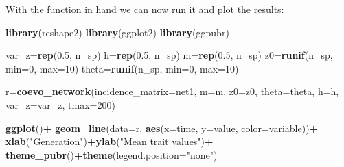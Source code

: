 \documentclass[
]{book}
\newenvironment{Shaded}{\begin{snugshade}}{\end{snugshade}}
\newcommand{\AttributeTok}[1]{\textcolor[rgb]{0.13,0.29,0.53}{#1}}
\newcommand{\CommentTok}[1]{\textcolor[rgb]{0.56,0.35,0.01}{\textit{#1}}}
\newcommand{\DecValTok}[1]{\textcolor[rgb]{0.00,0.00,0.81}{#1}}
\newcommand{\FloatTok}[1]{\textcolor[rgb]{0.00,0.00,0.81}{#1}}
\newcommand{\FunctionTok}[1]{\textcolor[rgb]{0.13,0.29,0.53}{\textbf{#1}}}
\newcommand{\NormalTok}[1]{#1}
\newcommand{\OtherTok}[1]{\textcolor[rgb]{0.56,0.35,0.01}{#1}}
\newcommand{\SpecialCharTok}[1]{\textcolor[rgb]{0.81,0.36,0.00}{\textbf{#1}}}
\newcommand{\StringTok}[1]{\textcolor[rgb]{0.31,0.60,0.02}{#1}}
\begin{document}
\begin{Shaded}
\end{Shaded}

With the function in hand we can now run it and plot the results:

\begin{Shaded}
\begin{Highlighting}[]
\FunctionTok{library}\NormalTok{(reshape2)}
\FunctionTok{library}\NormalTok{(ggplot2)}
\FunctionTok{library}\NormalTok{(ggpubr)}

\NormalTok{var\_z}\OtherTok{=}\FunctionTok{rep}\NormalTok{(}\FloatTok{0.5}\NormalTok{, n\_sp) }
\NormalTok{h}\OtherTok{=}\FunctionTok{rep}\NormalTok{(}\FloatTok{0.5}\NormalTok{, n\_sp) }
\NormalTok{m}\OtherTok{=}\FunctionTok{rep}\NormalTok{(}\FloatTok{0.5}\NormalTok{, n\_sp) }
\NormalTok{z0}\OtherTok{=}\FunctionTok{runif}\NormalTok{(n\_sp, }\AttributeTok{min=}\DecValTok{0}\NormalTok{, }\AttributeTok{max=}\DecValTok{10}\NormalTok{)}
\NormalTok{theta}\OtherTok{=}\FunctionTok{runif}\NormalTok{(n\_sp, }\AttributeTok{min=}\DecValTok{0}\NormalTok{, }\AttributeTok{max=}\DecValTok{10}\NormalTok{) }

\NormalTok{r}\OtherTok{=}\FunctionTok{coevo\_network}\NormalTok{(}\AttributeTok{incidence\_matrix=}\NormalTok{net1, }\AttributeTok{m=}\NormalTok{m, }\AttributeTok{z0=}\NormalTok{z0, }\AttributeTok{theta=}\NormalTok{theta, }\AttributeTok{h=}\NormalTok{h, }\AttributeTok{var\_z=}\NormalTok{var\_z, }\AttributeTok{tmax=}\DecValTok{200}\NormalTok{)}

\FunctionTok{ggplot}\NormalTok{()}\SpecialCharTok{+}
  \FunctionTok{geom\_line}\NormalTok{(}\AttributeTok{data=}\NormalTok{r, }\FunctionTok{aes}\NormalTok{(}\AttributeTok{x=}\NormalTok{time, }\AttributeTok{y=}\NormalTok{value, }\AttributeTok{color=}\NormalTok{variable))}\SpecialCharTok{+}
  \FunctionTok{xlab}\NormalTok{(}\StringTok{"Generation"}\NormalTok{)}\SpecialCharTok{+}\FunctionTok{ylab}\NormalTok{(}\StringTok{"Mean trait values"}\NormalTok{)}\SpecialCharTok{+}
  \FunctionTok{theme\_pubr}\NormalTok{()}\SpecialCharTok{+}\FunctionTok{theme}\NormalTok{(}\AttributeTok{legend.position=}\StringTok{"none"}\NormalTok{)}
\end{Highlighting}
\end{Shaded}
\end{document}
